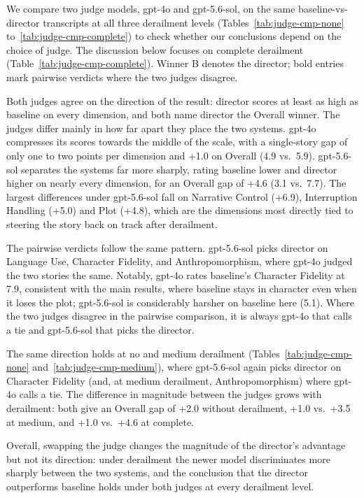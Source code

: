 We compare two judge models, gpt-4o and gpt-5.6-sol, on the same baseline-vs-director transcripts at all three derailment levels (Tables~\ref{tab:judge-cmp-none} to~\ref{tab:judge-cmp-complete}) to check whether our conclusions depend on the choice of judge. The discussion below focuses on complete derailment (Table~\ref{tab:judge-cmp-complete}). Winner B denotes the director; bold entries mark pairwise verdicts where the two judges disagree.

Both judges agree on the direction of the result: director scores at least as high as baseline on every dimension, and both name director the Overall winner. The judges differ mainly in how far apart they place the two systems. gpt-4o compresses its scores towards the middle of the scale, with a single-story gap of only one to two points per dimension and +1.0 on Overall (4.9 vs.\ 5.9). gpt-5.6-sol separates the systems far more sharply, rating baseline lower and director higher on nearly every dimension, for an Overall gap of +4.6 (3.1 vs.\ 7.7). The largest differences under gpt-5.6-sol fall on Narrative Control (+6.9), Interruption Handling (+5.0) and Plot (+4.8), which are the dimensions most directly tied to steering the story back on track after derailment.

The pairwise verdicts follow the same pattern. gpt-5.6-sol picks director on Language Use, Character Fidelity, and Anthropomorphism, where gpt-4o judged the two stories the same. Notably, gpt-4o rates baseline's Character Fidelity at 7.9, consistent with the main results, where baseline stays in character even when it loses the plot; gpt-5.6-sol is considerably harsher on baseline here (5.1). Where the two judges disagree in the pairwise comparison, it is always gpt-4o that calls a tie and gpt-5.6-sol that picks the director.

The same direction holds at no and medium derailment (Tables~\ref{tab:judge-cmp-none} and~\ref{tab:judge-cmp-medium}), where gpt-5.6-sol again picks director on Character Fidelity (and, at medium derailment, Anthropomorphism) where gpt-4o calls a tie. The difference in magnitude between the judges grows with derailment: both give an Overall gap of +2.0 without derailment, +1.0 vs.\ +3.5 at medium, and +1.0 vs.\ +4.6 at complete.

Overall, swapping the judge changes the magnitude of the director's advantage but not its direction: under derailment the newer model discriminates more sharply between the two systems, and the conclusion that the director outperforms baseline holds under both judges at every derailment level.
